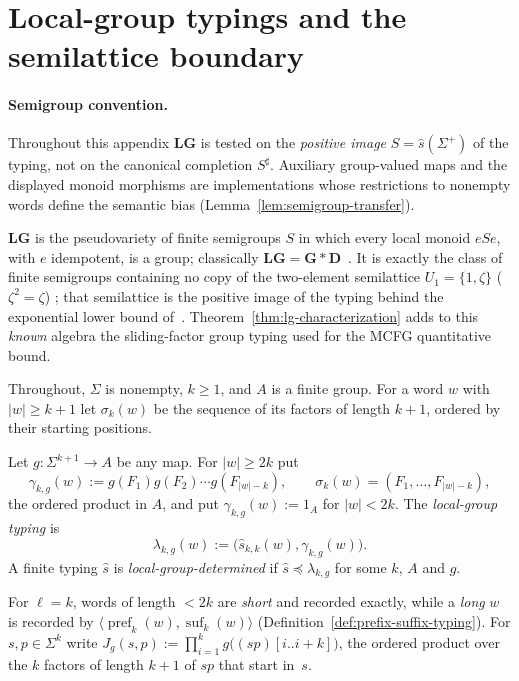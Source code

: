 \section{Local-group typings and the semilattice boundary}
\label{app:local-group}

\paragraph{Semigroup convention.}
Throughout this appendix $\mathbf{LG}$ is tested on the
\emph{positive image} $S=\widehat{s}(\Sigma^+)$ of the typing,
not on the canonical completion $S^\sharp$.
Auxiliary group-valued maps and the displayed monoid morphisms
are implementations whose restrictions to nonempty words define
the semantic bias (Lemma~\ref{lem:semigroup-transfer}).

$\mathbf{LG}$ is the pseudovariety of finite semigroups $S$ in which every
local monoid $eSe$, with $e$ idempotent, is a group; classically
$\mathbf{LG}=\mathbf G*\mathbf D$~\cite{Straubing1985,Tilson1987}.  It is
exactly the class of finite semigroups containing no copy of the two-element
semilattice $U_1=\{1,\zeta\}$ ($\zeta^2=\zeta$)
\cite[Proposition~2.3]{AlmeidaEtAl2009}; that semilattice is the positive
image of the typing behind the exponential lower bound of~\cite{kuriyamaCFG}.
Theorem~\ref{thm:lg-characterization} adds to this \emph{known} algebra the
sliding-factor group typing used for the MCFG quantitative bound.

Throughout, $\Sigma$ is nonempty, $k\ge1$, and $A$ is a finite group.  For a
word $w$ with $|w|\ge k+1$ let $\sigma_k(w)$ be the sequence of its factors of
length $k+1$, ordered by their starting positions.

\begin{definition}
\label{def:local-group-typing}
Let $g:\Sigma^{k+1}\to A$ be any map.  For $|w|\ge2k$ put
\[
 \gamma_{k,g}(w):=g(F_1)g(F_2)\cdots g(F_{|w|-k}),
 \qquad \sigma_k(w)=(F_1,\ldots,F_{|w|-k}),
\]
the ordered product in $A$, and put $\gamma_{k,g}(w):=1_A$ for
$|w|<2k$.  The \emph{local-group typing} is
\[
 \lambda_{k,g}(w):=\bigl(\widehat{s}_{k,k}(w),\gamma_{k,g}(w)\bigr).
\]
A finite typing $\widehat{s}$ is \emph{local-group-determined} if
$\widehat{s}\preceq\lambda_{k,g}$ for some $k$, $A$ and $g$.
\end{definition}

For $\ell=k$, words of length $<2k$ are \emph{short} and recorded exactly,
while a \emph{long} $w$ is recorded by
$\langle\operatorname{pref}_k(w),\operatorname{suf}_k(w)\rangle$
(Definition~\ref{def:prefix-suffix-typing}).  For $s,p\in\Sigma^k$ write
$J_g(s,p):=\prod_{i=1}^{k}g\bigl((sp)[i..i+k]\bigr)$, the ordered product over
the $k$ factors of length $k+1$ of $sp$ that start in~$s$.

